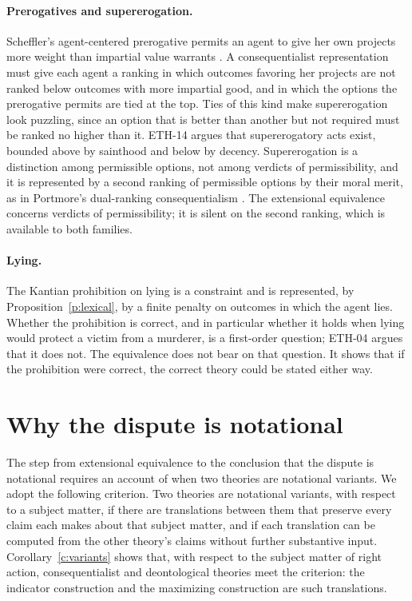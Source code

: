 \documentclass{situationist-preprint}
\begin{document}
\paragraph{Prerogatives and supererogation.} Scheffler's agent-centered prerogative permits an agent to give her own projects more weight than impartial value warrants \citep{Scheffler1982}. A consequentialist representation must give each agent a ranking in which outcomes favoring her projects are not ranked below outcomes with more impartial good, and in which the options the prerogative permits are tied at the top. Ties of this kind make supererogation look puzzling, since an option that is better than another but not required must be ranked no higher than it. ETH-14 argues that supererogatory acts exist, bounded above by sainthood and below by decency. Supererogation is a distinction among permissible options, not among verdicts of permissibility, and it is represented by a second ranking of permissible options by their moral merit, as in Portmore's dual-ranking consequentialism \citep{Portmore2011}. The extensional equivalence concerns verdicts of permissibility; it is silent on the second ranking, which is available to both families.

\paragraph{Lying.} The Kantian prohibition on lying is a constraint and is represented, by Proposition~\ref{p:lexical}, by a finite penalty on outcomes in which the agent lies. Whether the prohibition is correct, and in particular whether it holds when lying would protect a victim from a murderer, is a first-order question; ETH-04 argues that it does not. The equivalence does not bear on that question. It shows that if the prohibition were correct, the correct theory could be stated either way.

\section{Why the dispute is notational}\label{s:notational}

The step from extensional equivalence to the conclusion that the dispute is notational requires an account of when two theories are notational variants. We adopt the following criterion. Two theories are notational variants, with respect to a subject matter, if there are translations between them that preserve every claim each makes about that subject matter, and if each translation can be computed from the other theory's claims without further substantive input. Corollary~\ref{c:variants} shows that, with respect to the subject matter of right action, consequentialist and deontological theories meet the criterion: the indicator construction and the maximizing construction are such translations.
\end{document}
